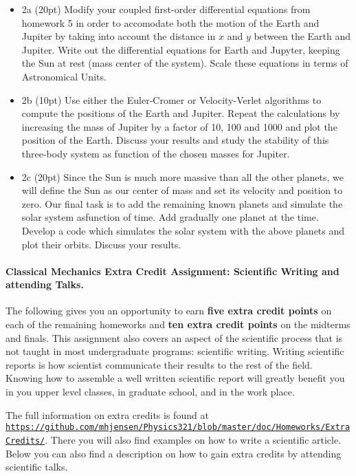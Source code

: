 \documentclass[%
oneside,                 %
final,                   %
10pt]{article}
\begin{document}
\begin{itemize}
\item 2a (20pt) Modify your coupled first-order differential equations from homework 5 in order to accomodate both the motion of the Earth and Jupiter by taking into account the distance in $x$ and $y$ between the Earth and Jupiter. Write out the differential equations for  Earth and Jupyter, keeping the Sun at rest (mass center of the system). Scale these equations in terms of Astronomical Units.

\item 2b (10pt) Use either the Euler-Cromer or Velocity-Verlet algorithms to compute the positions of the Earth and Jupiter. Repeat the calculations by increasing the mass of Jupiter by a factor of 10, 100 and 1000 and plot the position of the Earth.  Discuss your results and study the stability of this three-body system as function of the chosen masses for Jupiter.

\item 2c (20pt) Since the Sun is much more massive than all the other planets, we will define the Sun as our center of mass and set its velocity and position to zero.  Our final task is to add the remaining known planets and simulate the solar system asfunction of time. Add gradually one planet at the time. Develop a code which simulates the solar system with the above planets and plot their orbits. Discuss your results.
\end{itemize}

\noindent
\paragraph{Classical Mechanics Extra Credit Assignment: Scientific Writing and attending Talks.}
The following gives you an opportunity to earn \textbf{five extra credit
points} on each of the remaining homeworks and \textbf{ten extra credit points}
on the midterms and finals.  This assignment also covers an aspect of
the scientific process that is not taught in most undergraduate
programs: scientific writing.  Writing scientific reports is how
scientist communicate their results to the rest of the field.  Knowing
how to assemble a well written scientific report will greatly benefit
you in you upper level classes, in graduate school, and in the work
place.

The full information on extra credits is found at \href{{https://github.com/mhjensen/Physics321/blob/master/doc/Homeworks/ExtraCredits/}}{\nolinkurl{https://github.com/mhjensen/Physics321/blob/master/doc/Homeworks/ExtraCredits/}}. There you will also find examples on how to write a scientific article. 
Below you can also find a description on how to gain extra credits by attending scientific talks.
\end{document}
